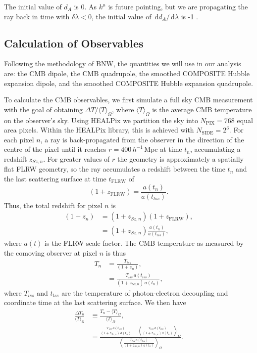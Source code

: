\documentclass[a4paper,12pt]{report}
\newcommand{\diff}[1]{\,\text{d}{#1}}
\begin{document}
The initial value of $d_A$ is 0. As $k^\mu$ is future pointing, but we are propagating the ray back in time with $\delta \lambda < 0$, the initial value of $\diff{d_A}/\diff{\lambda}$ is -1 \cite{RN195}.

\subsection{Calculation of Observables}
Following the methodology of BNW, the quantities we will use in our analysis are: the CMB dipole, the CMB quadrupole, the smoothed COMPOSITE Hubble expansion dipole, and the smoothed COMPOSITE Hubble expansion quadrupole.

To calculate the CMB observables, we first simulate a full sky CMB measurement with the goal of obtaining $\Delta T / \langle T \rangle_\Omega$, where $\langle T \rangle_\Omega$ is the average CMB temperature on the observer's sky. Using HEALPix \cite{RN250} we partition the sky into $N_{\text{PIX}}=768$ equal area pixels. Within the HEALPix \cite{RN250} library, this is achieved with $N_{\text{SIDE}}=2^3$. For each pixel $n$, a ray is back-propagated from the observer in the direction of the centre of the pixel until it reaches $r=400\,h^{-1}\,$Mpc at time $t_n$, accumulating a redshift $z_{Sz,n}$. For greater values of $r$ the geometry is approximately a spatially flat FLRW geometry, so the ray accumulates a redshift between the time $t_n$ and the last scattering surface at time $t_\text{FLRW}$ of
\begin{equation}
    (1+z_\text{FLRW}) = \frac{a(t_n)}{a(t_{lss})}.
\end{equation}
Thus, the total redshift for pixel $n$ is
\begin{align}
    (1+z_n) &= (1+z_{Sz,n}) (1+z_\text{FLRW}), \\
    &= (1+z_{Sz,n})\frac{a(t_n)}{a(t_{lss})},
\end{align}
where $a(t)$ is the FLRW scale factor. The CMB temperature as measured by the comoving observer at pixel $n$ is thus
\newcommand{\tempexp}[1]{\frac{T_{lss}\, a(t_{lss})}{(1+z_{Sz,#1})\, a(t_{#1})}}
\begin{align}
    T_n &= \frac{T_{lss}}{(1+z_n)}, \\
    &= \tempexp{n},
\end{align}
where $T_{lss}$ and $t_{lss}$ are the temperature of photon-electron decoupling and coordinate time at the last scattering surface. We then have
\begin{align}
    \frac{\Delta T_n}{\langle T \rangle_\Omega} &\equiv \frac{T_n -  \langle T \rangle_\Omega}{\langle T \rangle_\Omega},\\
    &= \frac{\tempexp{n} - \left\langle\tempexp{n}\right\rangle_\Omega}{\left\langle\tempexp{n}\right\rangle_\Omega}.
\end{align}
\end{document}
